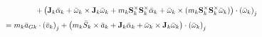 \documentclass[a4paper,10pt]{article}
\newcommand\scalemath[2]{\scalebox{#1}{\mbox{\ensuremath{\displaystyle #2}}}}
\begin{document}
\begin{align}
 &\scalemath{0.775}{\hspace{40pt}+\left(\mathbf{J}_{k} \bar{\alpha}_k + \bar{\omega}_k \times \mathbf{J}_{k} \bar{\omega}_k + m_k\mathbf{S}^{\times}_k\mathbf{S}^{\times}_k\bar{\alpha}_k + \bar{\omega}_k \times (m_k\mathbf{S}^{\times}_k\mathbf{S}^{\times}_k \bar{\omega}_k)\right) \cdot \left( \bar\omega_k \right)_j} \nonumber \\
 &\scalemath{0.775}{=  m_k \bar{a}_{Gk} \cdot \left(\bar{v}_k\right)_j + \left( m_k \bar{S}_k \times \bar{a}_k + \mathbf{J}_{k} \bar{\alpha}_k + \bar{\omega}_k \times \mathbf{J}_{k} \bar{\omega}_k\right) \cdot  \left(\bar{\omega}_k\right)_j} \nonumber 
\end{align}

\end{document}
